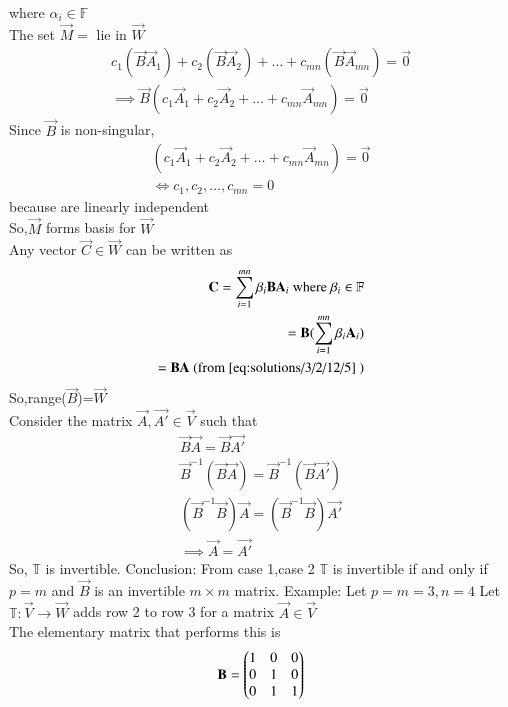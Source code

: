 where $\alpha_i \in \mathbb{F}$\\
The set $\vec{M}= $  lie in $\vec{W}$
\begin{align}
    c_1(\vec{B}\vec{A}_1)+c_2(\vec{B}\vec{A}_2)+\hdots+c_{mn}(\vec{B}\vec{A}_{mn})=\vec{0}\\
    \implies \vec{B}(c_1\vec{A}_1+c_2\vec{A}_2+\hdots+c_{mn}\vec{A}_{mn})=\vec{0}
\end{align}
Since $\vec{B}$ is non-singular,
\begin{align}
    (c_1\vec{A}_1+c_2\vec{A}_2+\hdots+c_{mn}\vec{A}_{mn})=\vec{0}\\
    \iff c_1,c_2,\hdots,c_{mn}=0
\end{align}
because  are linearly independent\\ 
So,$\vec{M}$ forms basis for $\vec{W}$\\
Any vector $\vec{C} \in \vec{W}$ can be written as
\begin{align}
    \vec{C}=\sum_{i=1}^{mn} \beta_i\vec{B}\vec{A}_i \text{  where }\beta_i \in \mathbb{F}\\
    =\vec{B}(\sum_{i=1}^{mn}\beta_i\vec{A}_i)\\
    =\vec{B}\vec{A} \text{  (from \eqref{eq:solutions/3/2/12/5} )}
\end{align}
So,range($\vec{B}$)=$\vec{W}$\\
Consider the matrix $\vec{A},\vec{A'} \in \vec{V}$ such that
\begin{align}
    \vec{B}\vec{A}= \vec{B}\vec{A'}\\
    \vec{B}^{-1}( \vec{B}\vec{A})= \vec{B}^{-1}(\vec{B}\vec{A'})\\
    (\vec{B}^{-1} \vec{B})\vec{A}= (\vec{B}^{-1}\vec{B})\vec{A'}\\
    \implies \vec{A}=\vec{A'}
\end{align}
So, $\mathbb{T}$ is invertible.
{Conclusion: }
From case 1,case 2 $\mathbb{T}$ is invertible if and only if $p=m$ and $\vec{B}$ is an invertible $m \times m$ matrix.
{Example: }
Let $p=m=3 ,n=4$
Let $\mathbb{T}:\vec{V} \rightarrow \vec{W}$ adds row 2 to row 3 for a matrix $\vec{A} \in \vec{V}$\\
The elementary matrix that performs this is
\begin{align}
    \vec{B}= \myvec{1&0&0\\0&1&0\\0&1&1}
\end{align}
